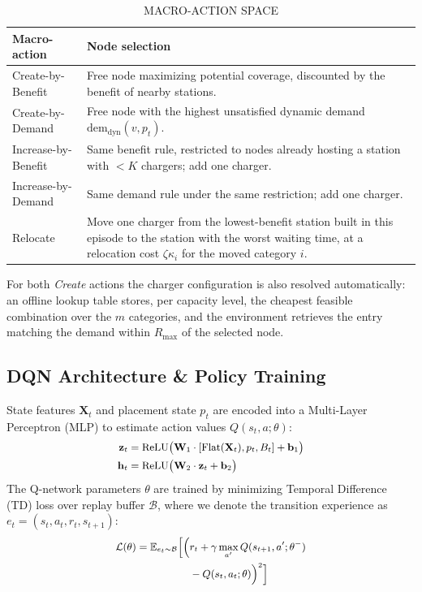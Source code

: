 \documentclass[10pt, conference, a4paper, compsocconf]{IEEEtran}
\begin{document}
\begin{table}[t]
\renewcommand{\arraystretch}{1.15}
\caption{\uppercase{Macro-action space}}
\label{tab:actions}
\centering
\footnotesize
\begin{tabular}{p{3.2cm}p{13cm}}
\toprule
\textbf{Macro-action} & \textbf{Node selection} \\
\midrule
Create-by-Benefit &
Free node maximizing potential coverage, discounted by the benefit of nearby stations. \\

Create-by-Demand &
Free node with the highest unsatisfied dynamic demand
$\mathrm{dem}_{\mathrm{dyn}}(v,p_t)$. \\

Increase-by-Benefit &
Same benefit rule, restricted to nodes already hosting a station with
$<K$ chargers; add one charger. \\

Increase-by-Demand &
Same demand rule under the same restriction; add one charger. \\

Relocate &
Move one charger from the lowest-benefit station built in this episode
to the station with the worst waiting time, at a relocation cost
$\zeta\kappa_i$ for the moved category $i$. \\
\bottomrule
\end{tabular}
\end{table}

For both \emph{Create} actions the charger configuration is also resolved automatically: an offline lookup table stores, per capacity level, the cheapest feasible combination over the $m$ categories, and the environment retrieves the entry matching the demand within $R_{\max}$ of the selected node.

\subsection{DQN Architecture \& Policy Training}

State features $\mathbf{X}_t$ and placement state $p_t$ are encoded into a Multi-Layer Perceptron (MLP) to estimate action values $Q(s_t, a; \theta)$:
\begin{equation}\small
\begin{aligned}
\mathbf{z}_t &= \text{ReLU}\big( \mathbf{W}_1 \cdot [ \text{Flat}(\mathbf{X}_t), p_t, B_t ] + \mathbf{b}_1 \big) \\
\mathbf{h}_t &= \text{ReLU}\big( \mathbf{W}_2 \cdot \mathbf{z}_t + \mathbf{b}_2 \big)
\end{aligned}
\end{equation}
The Q-network parameters $\theta$ are trained by minimizing Temporal Difference (TD) loss over replay buffer $\mathcal{B}$, where we denote the transition experience as $e_t = (s_t, a_t, r_t, s_{t+1})$:
\begin{equation}\small
\begin{aligned}
\mathcal{L}(\theta) = \mathbb{E}_{e_t \sim \mathcal{B}} \Big[ \Big( &r_t + \gamma \max_{a'} Q(s_{t+1}, a'; \theta^-) \\
&- Q(s_t, a_t; \theta) \Big)^2 \Big]
\end{aligned}
\end{equation}
\end{document}

